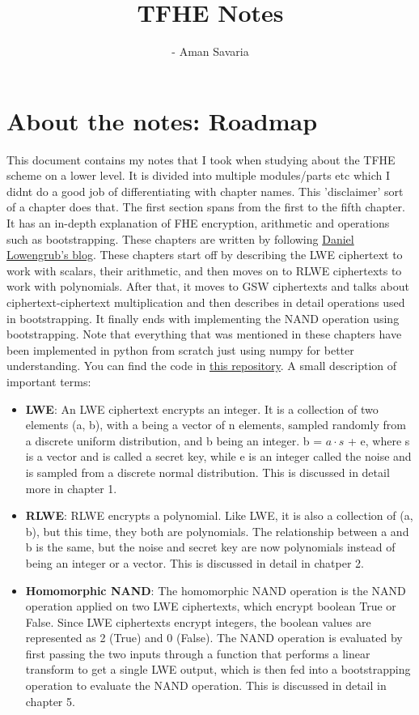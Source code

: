 \documentclass{report}
\title{\Huge \textbf{TFHE Notes}}
\author{\hspace{5cm }- Aman Savaria}
\date{}
\begin{document}
\maketitle
\setcounter{chapter}{-1}

\chapter{About the notes: Roadmap}
This document contains my notes that I took when studying about the TFHE scheme on a lower level. It is divided into multiple modules/parts etc which I didnt do a good job of differentiating with chapter names. This 'disclaimer' sort of a chapter does that.\newline
\newline
The first section spans from the first to the fifth chapter. It has an in-depth explanation of FHE encryption, arithmetic and operations such as bootstrapping. These chapters are written by following \hyperref[ref:blog]{Daniel Lowengrub's blog}. These chapters start off by describing the LWE ciphertext to work with scalars, their arithmetic, and then moves on to RLWE ciphertexts to work with polynomials. After that, it moves to GSW ciphertexts and talks about ciphertext-ciphertext multiplication and then describes in detail operations used in bootstrapping. It finally ends with implementing the NAND operation using bootstrapping. Note that everything that was mentioned in these chapters have been implemented in python from scratch just using numpy for better understanding. You can find the code in \href{https://github.com/AmanSavaria1402/FHE_implementation}{this repository}.
A small description of important terms:
\begin{itemize}
	\item \textbf{LWE}: An LWE ciphertext encrypts an integer. It is a collection of two elements (a, b), with a being a vector of n elements, sampled randomly from a discrete uniform distribution, and b being an integer. b = $ a\cdot s $ + e, where s is a vector and is called a secret key, while e is an integer called the noise and is sampled from a discrete normal distribution. This is discussed in detail more in chapter 1.
	\item \textbf{RLWE}: RLWE encrypts a polynomial. Like LWE, it is also a collection of (a, b), but this time, they both are polynomials. The relationship between a and b is the same, but the noise and secret key are now polynomials instead of being an integer or a vector. This is discussed in detail in chatper 2.
	\item \textbf{Homomorphic NAND}: The homomorphic NAND operation is the NAND operation applied on two LWE ciphertexts, which encrypt boolean True or False. Since LWE ciphertexts encrypt integers, the boolean values  are represented as 2 (True) and 0 (False). The NAND operation is evaluated by first passing the two inputs through a function that performs a linear transform to get a single LWE output, which is then fed into a bootstrapping operation to evaluate the NAND operation. This is discussed in detail in chapter 5.
\end{itemize}
\end{document}

